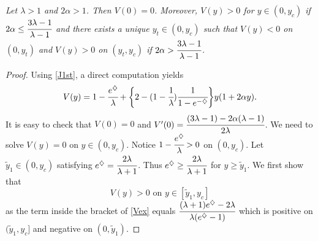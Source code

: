 \documentclass[11pt]{article}
\begin{document}
\medskip

 {\em Let $\lambda>1$ and $2\alpha>1$.
Then $V(0)=0$. Moreover, $V(y)>0$ for $y\in(0, y_c)$ if
$2\alpha\leq\cfrac{3\lambda-1}{\lambda-1}$ and there exists a
unique $y_t\in(0, y_c)$ such that $V(y)<0$ on $(0, y_t)$ and
$V(y)>0$ on $(y_t, y_c)$ if
$2\alpha>\cfrac{3\lambda-1}{\lambda-1}$.}
\begin{proof}
 Using \eqref{J1st}, a direct computation yields
\begin{equation}\label{Vex}
V(y)= 1-\cfrac{e^\diamondsuit}{\lambda} +\bigg \{
2-(1-\cfrac{1}{\lambda})\cfrac{1}{1-e^{-\diamondsuit}}\bigg
\}y(1+2\alpha y).
\end{equation}
It is easy to check that $V(0)=0$ and
$V^\prime(0)=\cfrac{(3\lambda-1)-2\alpha(\lambda-1)}{2\lambda}$.
We need to solve $V(y)=0$ on $y \in (0, y_c)$.  Notice
$1-\cfrac{e^\diamondsuit}{\lambda} >0$ on  $(0, y_c)$. Let $\tilde
y_1 \in (0, y_c) $ satisfying
$e^\diamondsuit=\cfrac{2\lambda}{\lambda+1}$. Thus $e^\diamondsuit
\geq \cfrac{2\lambda}{\lambda+1}$ for $ y \geq \tilde y_1$. We
first show that
\begin{equation}\label{Vpos}
V(y)>0 \mbox{ on } y \in [\tilde y_1, y_c]
\end{equation}
as  the term inside the bracket of \eqref{Vex} equals $   \cfrac{(\lambda+1)e^{\diamondsuit}-2 \lambda }{\lambda ( e^{\diamondsuit}-1)}  $
which is positive on $(\tilde y_1, y_c]$ and negative on $(0, \tilde y_1)$.


\end{proof}
\end{document}
